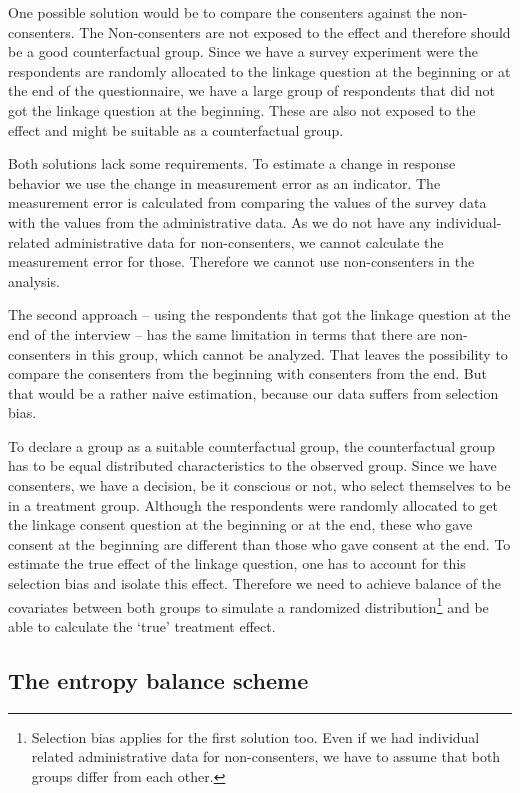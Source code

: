 One possible solution would be to compare the consenters against the non-consenters. The Non-consenters are not exposed to the effect and therefore should be a good counterfactual group. Since we have a survey experiment were the respondents are randomly allocated to the linkage question at the beginning or at the end of the questionnaire, we have a large group of respondents that did not got the linkage question at the beginning. These are also not exposed to the effect and might be suitable as a counterfactual group.

Both solutions lack some requirements. To estimate a change in response behavior we use the change in measurement error as an indicator. The measurement error is calculated from comparing the values of the survey data with the values from the administrative data. As we do not have any individual-related administrative data for non-consenters, we cannot calculate the measurement error for those. Therefore we cannot use non-consenters in the analysis.

The second approach -- using the respondents that got the linkage question at the end of the interview -- has the same limitation in terms that there are non-consenters in this group, which cannot be analyzed. That leaves the possibility to compare the consenters from the beginning with consenters from the end. But that would be a rather naive estimation, because our data suffers from selection bias.

To declare a group as a suitable counterfactual group, the counterfactual group has to be equal distributed characteristics to the observed group. Since we have consenters, we have a decision, be it conscious or not, who select themselves to be in a treatment group. Although the respondents were randomly allocated to get the linkage consent question at the beginning or at the end, these who gave consent at the beginning are different than those who gave consent at the end. To estimate the true effect of the linkage question, one has to account for this selection bias and isolate this effect. Therefore we need to achieve balance of the covariates between both groups to simulate a randomized distribution\footnote{Selection bias applies for the first solution too. Even if we had individual related administrative data for non-consenters, we have to assume that both groups differ from each other.} and be able to calculate the `true' treatment effect.

\subsection{The entropy balance scheme}

